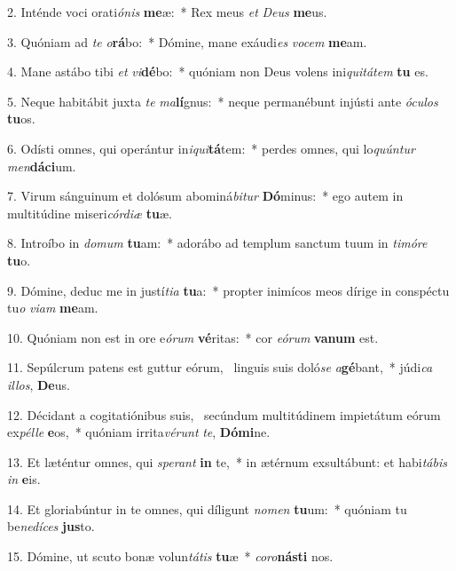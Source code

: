 2. Inténde voci orati\textit{ó}\textit{nis} \textbf{me}æ:~*  Rex meus \textit{et} \textit{De}\textit{us} \textbf{me}us.\

3. Quóniam ad \textit{te} \textit{o}\textbf{rá}bo:~*  Dómine, mane exáudi\textit{es} \textit{vo}\textit{cem} \textbf{me}am.\

4. Mane astábo tibi \textit{et} \textit{vi}\textbf{dé}bo:~*  quóniam non Deus volens ini\textit{qui}\textit{tá}\textit{tem} \textbf{tu} es.\

5. Neque habitábit juxta \textit{te} \textit{ma}\textbf{lí}gnus:~*  neque permanébunt injústi ante \textit{ó}\textit{cu}\textit{los} \textbf{tu}os.\

6. Odísti omnes, qui operántur in\textit{i}\textit{qui}\textbf{tá}tem:~*  perdes omnes, qui lo\textit{quún}\textit{tur} \textit{men}\textbf{dá}\textbf{ci}um.\

7. Virum sánguinum et dolósum abominá\textit{bi}\textit{tur} \textbf{Dó}minus:~*  ego autem in multitúdine miseri\textit{cór}\textit{di}\textit{æ} \textbf{tu}æ.\

8. Introíbo in \textit{do}\textit{mum} \textbf{tu}am:~*  adorábo ad templum sanctum tuum in \textit{ti}\textit{mó}\textit{re} \textbf{tu}o.\

9. Dómine, deduc me in justí\textit{ti}\textit{a} \textbf{tu}a:~*  propter inimícos meos dírige in conspéctu tu\textit{o} \textit{vi}\textit{am} \textbf{me}am.\

10. Quóniam non est in ore e\textit{ó}\textit{rum} \textbf{vé}ritas:~*  cor \textit{e}\textit{ó}\textit{rum} \textbf{va}\textbf{num} est.\

11. Sepúlcrum patens est guttur eórum, \dag\  linguis suis doló\textit{se} \textit{a}\textbf{gé}bant,~*  júdi\textit{ca} \textit{il}\textit{los}, \textbf{De}us.\

12. Décidant a cogitatiónibus suis, \dag\  secúndum multitúdinem impietátum eórum ex\textit{pél}\textit{le} \textbf{e}os,~*  quóniam irrita\textit{vé}\textit{runt} \textit{te}, \textbf{Dó}\textbf{mi}ne.\

13. Et læténtur omnes, qui \textit{spe}\textit{rant} \textbf{in} te,~*  in ætérnum exsultábunt: et habi\textit{tá}\textit{bis} \textit{in} \textbf{e}is.\

14. Et gloriabúntur in te omnes, qui díligunt \textit{no}\textit{men} \textbf{tu}um:~*  quóniam tu be\textit{ne}\textit{dí}\textit{ces} \textbf{jus}to.\

15. Dómine, ut scuto bonæ volun\textit{tá}\textit{tis} \textbf{tu}æ~*  \textit{co}\textit{ro}\textbf{nás}\textbf{ti} nos.\

